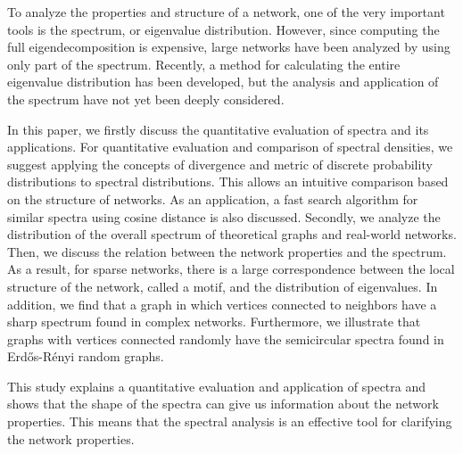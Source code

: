 \documentclass[senior,final,11pt]{iscs-thesis}
\date{January 29, 2021}
\begin{document}
\begin{eabstract}
    To analyze the properties and structure of a network, one of the very important tools is the spectrum, or eigenvalue distribution. However, since computing the full eigendecomposition is expensive, large networks have been analyzed by using only part of the spectrum. Recently, a method for calculating the entire eigenvalue distribution has been developed, but the analysis and application of the spectrum have not yet been deeply considered.

    In this paper, we firstly discuss the quantitative evaluation of spectra and its applications. For quantitative evaluation and comparison of spectral densities, we suggest applying the concepts of divergence and metric of discrete probability distributions to spectral distributions. This allows an intuitive comparison based on the structure of networks. As an application, a fast search algorithm for similar spectra using cosine distance is also discussed. Secondly, we analyze the distribution of the overall spectrum of theoretical graphs and real-world networks. Then, we discuss the relation between the network properties and the spectrum. As a result, for sparse networks, there is a large correspondence between the local structure of the network, called a motif, and the distribution of eigenvalues. In addition, we find that a graph in which vertices connected to neighbors have a sharp spectrum found in complex networks. Furthermore, we illustrate that graphs with vertices connected randomly have the semicircular spectra found in Erdős-Rényi random graphs.

    This study explains a quantitative evaluation and application of spectra and shows that the shape of the spectra can give us information about the network properties. This means that the spectral analysis is an effective tool for clarifying the network properties.


\end{eabstract}
\end{document}
